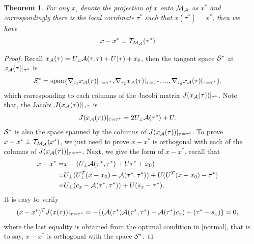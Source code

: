 \documentclass[aos,preprint]{imsart}
\newtheorem{theorem}{Theorem}[section]
\theoremstyle{remark}
\begin{document}
\begin{theorem}
For any $x$, denote the projection of $x$ onto ${\cal M_A}$ as $x^*$ and correspondingly there is the local corrdinate $\tau^*$ such that $x(\tau^*)=x^* $, then we have
\[
x-x^* \perp {\cal T}_{\cal M_A} (\tau^*)
\]
\end{theorem}
\begin{proof}
Recall $x_{\cal A}(\tau) = U_\perp {\cal A}(\tau,\tau)+U(\tau)+x_0$, then the tangent space ${\cal S}^*$ at $x_{\cal A}(\tau)|_{\tau^*}$ is
\[
{\cal S}^* = {\rm span}\{\nabla_{\tau_1} x_{\cal A}(\tau)|_{\tau=\tau^*}, \nabla_{\tau_2} x_{\cal A}(\tau)|_{\tau=\tau^*},...,\nabla_{\tau_d} x_{\cal A}(\tau)|_{\tau=\tau^*}\},
\]
which corresponding to each columns of the Jacobi matrix $J(x_{\cal A}(\tau))|_{\tau^*}$. Note that, the Jacobi $J(x_{\cal A}(\tau))|_{\tau^*}$ is
\[
J(x_{\cal A}(\tau))|_{\tau=\tau^*} = 2U_\perp {\cal A}(\tau^*) + U.
\]
$\cal S^*$ is also the space spanned by the columns of $J(x_{\cal A}(\tau))|_{\tau=\tau^*}$. To prove $x-x^* \perp {\cal T}_{\cal M_A}({x^*})$, we just need to prove $x-x^*$ is orthogonal with each of the columns of $J(x_{\cal A}(\tau))|_{\tau=\tau^*}$. Next, we give the form of $x-x^*$, recall that
\[
\begin{aligned}
x-x^* =& x -  (U_\perp {\cal A}(\tau^*,\tau^*)+U\tau^*+x_0)\\
	=& U_\perp (U_\perp^T(x-x_0) - {\cal A}(\tau^*,\tau^*)) +U(U^T(x-x_0)-\tau^*)\\
	=& U_\perp(c_x - {\cal A}(\tau^*,\tau^*))+U(s_x-\tau^*).
\end{aligned}
\]
It is easy to verify
\[
(x-x^*)^T J(x(\tau))|_{\tau=\tau^*} = -\{({\cal A}(\tau^*){\cal A}(\tau^*,\tau^*)-{\cal A}(\tau^*)c_x) +(\tau^*-s_x)\} = 0,
\]
where the last equality is obtained from the optimal condition in \eqref{normal}, that is to say, $x-x^*$ is orthogonal with the space $\cal S^*$.
\end{proof}
\end{document}
